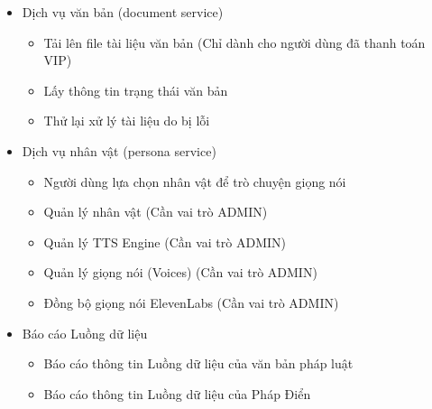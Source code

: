 \begin{itemize}

\item Dịch vụ văn bản (document service)
\begin{itemize}
\item Tải lên file tài liệu văn bản (Chỉ dành cho người dùng đã thanh toán VIP)
\item Lấy thông tin trạng thái văn bản
\item Thử lại xử lý tài liệu do bị lỗi
\end{itemize}

\item Dịch vụ nhân vật (persona service)
\begin{itemize}
\item Người dùng lựa chọn nhân vật để trò chuyện giọng nói
\item Quản lý nhân vật (Cần vai trò ADMIN)
\item Quản lý TTS Engine (Cần vai trò ADMIN)
\item Quản lý giọng nói (Voices) (Cần vai trò ADMIN)
\item Đồng bộ giọng nói ElevenLabs (Cần vai trò ADMIN)
\end{itemize}

\item Báo cáo Luồng dữ liệu
\begin{itemize}
\item Báo cáo thông tin Luồng dữ liệu của văn bản pháp luật
\item Báo cáo thông tin Luồng dữ liệu của Pháp Điển
\end{itemize}

\end{itemize}
